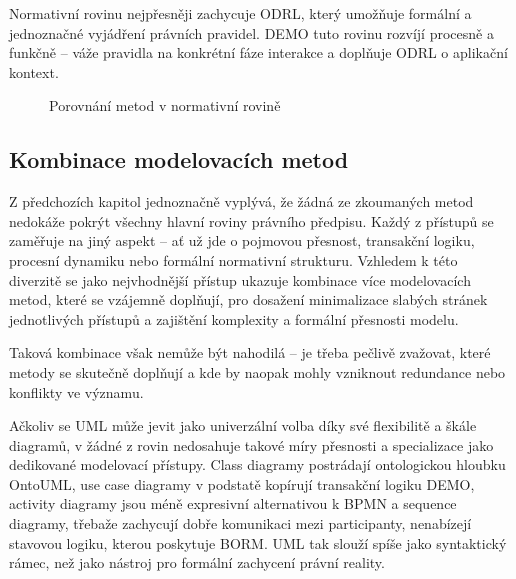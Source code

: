 Normativní rovinu nejpřesněji zachycuje ODRL, který umožňuje formální a jednoznačné vyjádření právních pravidel. DEMO tuto rovinu rozvíjí procesně a funkčně – váže pravidla na konkrétní fáze interakce a doplňuje ODRL o aplikační kontext.

\begin{figure}[H]
  \centering
  \caption{Porovnání metod v normativní rovině}
\end{figure}


\subsection{Kombinace modelovacích metod}
\label{sec:kombinace-modelovacich-metod}
Z předchozích kapitol jednoznačně vyplývá, že žádná ze zkoumaných metod nedokáže pokrýt všechny hlavní roviny právního předpisu. Každý z přístupů se zaměřuje na jiný aspekt – ať už jde o pojmovou přesnost, transakční logiku, procesní dynamiku nebo formální normativní strukturu. Vzhledem k této diverzitě se jako nejvhodnější přístup ukazuje kombinace více modelovacích metod, které se vzájemně doplňují, pro dosažení minimalizace slabých stránek jednotlivých přístupů a zajištění komplexity a formální přesnosti modelu. 

Taková kombinace však nemůže být nahodilá – je třeba pečlivě zvažovat, které metody se skutečně doplňují a kde by naopak mohly vzniknout redundance nebo konflikty ve významu. 

Ačkoliv se UML může jevit jako univerzální volba díky své flexibilitě a škále diagramů, v žádné z rovin nedosahuje takové míry přesnosti a specializace jako dedikované modelovací přístupy. Class diagramy postrádají ontologickou hloubku OntoUML, use case diagramy v podstatě kopírují transakční logiku DEMO, activity diagramy jsou méně expresivní alternativou k BPMN a sequence diagramy, třebaže zachycují dobře komunikaci mezi participanty, nenabízejí stavovou logiku, kterou poskytuje BORM. UML tak slouží spíše jako syntaktický rámec, než jako nástroj pro formální zachycení právní reality.

